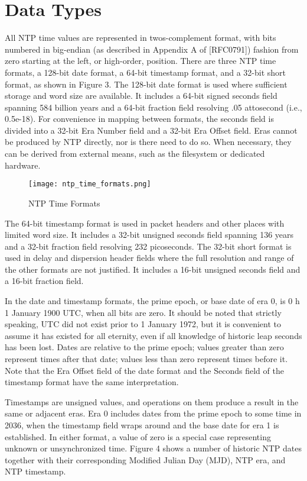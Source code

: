 \chapter{Data Types}

All NTP time values are represented in twos-complement format, with
bits numbered in big-endian (as described in Appendix A of [RFC0791])
fashion from zero starting at the left, or high-order, position.
There are three NTP time formats, a 128-bit date format, a 64-bit
timestamp format, and a 32-bit short format, as shown in Figure 3.
The 128-bit date format is used where sufficient storage and word
size are available. It includes a 64-bit signed seconds field
spanning 584 billion years and a 64-bit fraction field resolving .05
attosecond (i.e., 0.5e-18). For convenience in mapping between
formats, the seconds field is divided into a 32-bit Era Number field
and a 32-bit Era Offset field. Eras cannot be produced by NTP
directly, nor is there need to do so. When necessary, they can be
derived from external means, such as the filesystem or dedicated
hardware.

\begin{figure}
\centering
\texttt{[image: ntp\_time\_formats.png]}
\caption{NTP Time Formats}
\label{ntp_time_formats}
\end{figure}

The 64-bit timestamp format is used in packet headers and other
places with limited word size. It includes a 32-bit unsigned seconds
field spanning 136 years and a 32-bit fraction field resolving 232
picoseconds. The 32-bit short format is used in delay and dispersion
header fields where the full resolution and range of the other
formats are not justified. It includes a 16-bit unsigned seconds
field and a 16-bit fraction field.

In the date and timestamp formats, the prime epoch, or base date of
era 0, is 0 h 1 January 1900 UTC, when all bits are zero. It should
be noted that strictly speaking, UTC did not exist prior to 1 January
1972, but it is convenient to assume it has existed for all eternity,
even if all knowledge of historic leap seconds has been lost. Dates
are relative to the prime epoch; values greater than zero represent
times after that date; values less than zero represent times before
it. Note that the Era Offset field of the date format and the
Seconds field of the timestamp format have the same interpretation.

Timestamps are unsigned values, and operations on them produce a
result in the same or adjacent eras. Era 0 includes dates from the
prime epoch to some time in 2036, when the timestamp field wraps
around and the base date for era 1 is established. In either format,
a value of zero is a special case representing unknown or
unsynchronized time. Figure 4 shows a number of historic NTP dates
together with their corresponding Modified Julian Day (MJD), NTP era,
and NTP timestamp.

